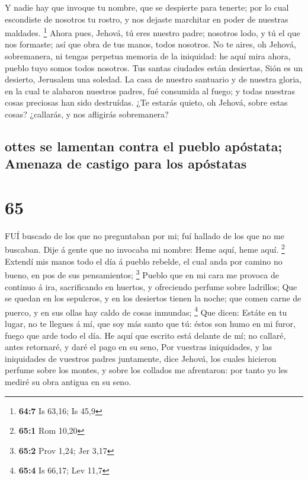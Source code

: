  Y nadie hay que invoque tu nombre, que se despierte para
tenerte; por lo cual escondiste de nosotros tu rostro, y nos dejaste
marchitar en poder de nuestras maldades. \footnote{\textbf{64:7} Is
  63,16; Is 45,9}  Ahora pues, Jehová, tú eres nuestro
padre; nosotros lodo, y tú el que nos formaste; así que obra de tus
manos, todos nosotros.  No te aires, oh Jehová, sobremanera,
ni tengas perpetua memoria de la iniquidad: he aquí mira ahora, pueblo
tuyo somos todos nosotros.  Tus santas ciudades están
desiertas, Sión es un desierto, Jerusalem una soledad.  La
casa de nuestro santuario y de nuestra gloria, en la cual te alabaron
nuestros padres, fué consumida al fuego; y todas nuestras cosas
preciosas han sido destruídas.  ¿Te estarás quieto, oh
Jehová, sobre estas cosas? ¿callarás, y nos afligirás sobremanera?

\hypertarget{ottes-se-lamentan-contra-el-pueblo-apuxf3stata-amenaza-de-castigo-para-los-apuxf3statas}{%
\subsection{ottes se lamentan contra el pueblo apóstata; Amenaza de
castigo para los
apóstatas}\label{ottes-se-lamentan-contra-el-pueblo-apuxf3stata-amenaza-de-castigo-para-los-apuxf3statas}}

\hypertarget{section-64}{%
\section{65}\label{section-64}}

 FUÍ buscado de los que no preguntaban por mi; fuí hallado
de los que no me buscaban. Dije á gente que no invocaba mi nombre: Heme
aquí, heme aquí. \footnote{\textbf{65:1} Rom 10,20}  Extendí
mis manos todo el día á pueblo rebelde, el cual anda por camino no
bueno, en pos de sus pensamientos; \footnote{\textbf{65:2} Prov 1,24;
  Jer 3,17}  Pueblo que en mi cara me provoca de continuo á
ira, sacrificando en huertos, y ofreciendo perfume sobre ladrillos;
 Que se quedan en los sepulcros, y en los desiertos tienen
la noche; que comen carne de puerco, y en sus ollas hay caldo de cosas
inmundas; \footnote{\textbf{65:4} Is 66,17; Lev 11,7}  Que
dicen: Estáte en tu lugar, no te llegues á mí, que soy más santo que tú:
éstos son humo en mi furor, fuego que arde todo el día.  He
aquí que escrito está delante de mí; no callaré, antes retornaré, y daré
el pago en su seno,  Por vuestras iniquidades, y las
iniquidades de vuestros padres juntamente, dice Jehová, los cuales
hicieron perfume sobre los montes, y sobre los collados me afrentaron:
por tanto yo les mediré su obra antigua en su seno.

